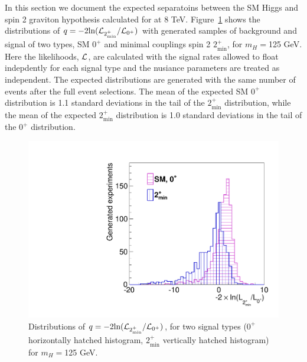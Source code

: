 In this section we document the expected separatoins between 
the SM Higgs and spin 2 graviton hypothesis calculated for \intlumiEightTeV 
at 8 TeV.  
Figure~\ref{fig:exp12fb} shows the distributions of 
$q=-2\text{ln}({\cal L}_{2_\text{min}^+}/{\cal L}_{\text{0}^+})$
with generated samples of background and signal of two types, 
SM $0^+$ and minimal couplings spin 2 $2_\text{min}^+$, for $m_H=$125 GeV. 
Here the likelihoods, $\cal L$, are calculated with the signal rates 
allowed to float indepdently for each signal type and the nusiance 
parameters are treated as independent. 
The expected distributions are generated with the same number of events 
after the full event selections. 
The mean of the expected SM $0^+$ distribution is 1.1 standard deviations 
in the tail of the $2_\text{min}^+$ distribution, while 
the mean of the expected $2_\text{min}^+$ distribution is 1.0 standard deviations 
in the tail of the $0^+$ distribution. 


\begin{figure}[!hbtp]
\centering
\label{subfig:res}
\includegraphics[width=.45\textwidth]{figures/hypo_separation_12fb.pdf}
\caption{Distributions of 
$q=-2\text{ln}({\cal L}_{2_\text{min}^+}/{\cal L}_{\text{0}^+})$, 
for two signal types ($0^+$ horizontally hatched histogram, 
$2_\text{min}^+$ vertically hatched histogram) for $m_H=$125 GeV. 
}
\label{fig:exp12fb}
\end{figure}
